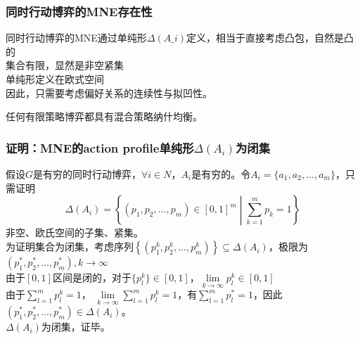 \documentclass{beamer}
\begin{document}

\begin{frame}[label = strategicgameMNEexist]
	\frametitle{同时行动博弈的MNE存在性}
	同时行动博弈的MNE通过单纯形$\Delta \left(A\_{i}\right)$定义，相当于直接考虑凸包，自然是凸的\\
	集合有限，显然是非空紧集\\
	单纯形定义在欧式空间\\
	因此，只需要考虑偏好关系的连续性与拟凹性。\\
	\begin{theorem}[策略博弈MNE存在性]
		\fangsong 
		任何有限策略博弈都具有混合策略纳什均衡。
	\end{theorem}
\end{frame}

\begin{frame}[label = MNE_Delta_A_i_close]
	\frametitle{证明：MNE的action profile单纯形$ \Delta \left(A_{i}\right) $为闭集}
	假设$G$是有穷的同时行动博弈，$\forall i \in N $，$A_{i}$是有穷的。令$A_{i}=\lbrace a_{1},a_{2},...,a_{m} \rbrace$，只需证明
	$$\Delta \left(A_{i}\right)=\left\lbrace\left(p_{1},p_{2},...,p_{m}\right)\in \left[0,1\right]^{m} \middle| \sum_{k=1}^{m} p_{k} = 1 \right\rbrace$$
	非空、欧氏空间的子集、紧集。\\
	为证明集合为闭集，考虑序列$\left\lbrace \left(p_{1}^{k},p_{2}^{k},...,p_{m}^{k}\right) \right\rbrace\subseteq \Delta\left(A_{i}\right)$，极限为$ \left(p_{1}^{*},p_{2}^{*},...,p_{m}^{*}\right) ,k\to \infty$\\
	由于$\left[0,1\right]$区间是闭的，对于$\lbrace p_{l}^{k} \rbrace \in \left[0,1\right]$，$\lim\limits_{k\to\infty}p_{l}^{k}\in \left[0,1\right]$\\
	由于$\sum\limits_{l=1}^{m} p_{l}^{k}=1$，	$\lim\limits_{k\to\infty}\sum\limits_{l=1}^{m} p_{l}^{k}=1$，有$\sum\limits_{l=1}^{m} p_{l}^{*}=1$，因此$ \left(p_{1}^{*},p_{2}^{*},...,p_{m}^{*}\right)\in\Delta \left(A_{i}\right) $。\\
	$ \Delta \left(A_{i}\right) $为闭集，证毕。
\end{frame}
\end{document}
